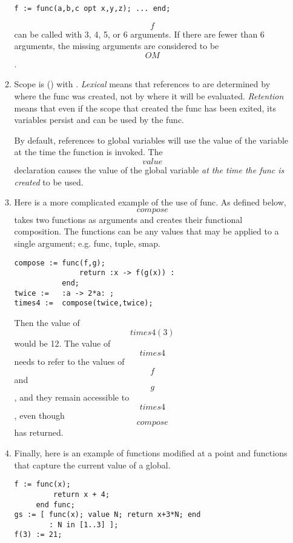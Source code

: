 \begin{enumerate}
\begin{enumerate}
	\CS
	\verb|f := func(a,b,c opt x,y,z); ... end;|
	\CE

	\[f\] can be called with 3, 4, 5, or 6 arguments.
	If there are fewer than 6 arguments, the missing arguments are
	considered to be \[OM\].

\pagebreak[1]
	\item
	Scope is  () with .
	{\em Lexical\/} means that
	references to  are determined by
	where the func was created,
	not by where it will be evaluated.
	{\em Retention\/} means that even
	if the scope that created the func has been exited,
	its variables persist and can be used by the func.

	By default, references to global variables will use the value
	of the variable at the time the function is invoked.
	The \[value\] declaration causes the value of the
	global variable {\em at the time the func is created\/} to
	be used.

\pagebreak[1]
	\item
	Here is a more complicated example of the use of func.
	As defined below, \[compose\] takes two functions as arguments
	and creates their functional composition.
	The functions can be any \ISETL{}
	values that may be applied to a single
	argument; e.g. func, tuple, smap.

\begin{indented}
\begin{verbatim}
compose := func(f,g); 
               return :x -> f(g(x)) :
           end;
twice :=   :a -> 2*a: ;
times4 :=  compose(twice,twice);
\end{verbatim}
\end{indented}
	
	Then the value of \[times4(3)\] would be 12.  	The value of
	\[times4\] needs to refer to the values of \[f\] and \[g\],
	and they remain accessible to \[times4\], 	even though
	\[compose\] has returned.

\pagebreak[1]
	\item
	Finally, here is an example of
	functions modified at a point and
	functions that capture the current value of a global.

\begin{indented}
\begin{verbatim}
f := func(x);
         return x + 4;
     end func;
gs := [ func(x); value N; return x+3*N; end
        : N in [1..3] ];
f(3) := 21;
\end{verbatim}
\end{indented}


\end{enumerate}
\end{enumerate}
